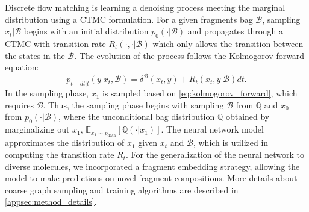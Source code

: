 Discrete flow matching is learning a denoising process meeting the marginal distribution using a CTMC formulation.
For a given fragments bag $\mathcal{B}$, sampling $x_t\vert \mathcal{B}$ begins with an initial distribution $p_0(\cdot|\mathcal{B})$ and propagates through a CTMC with transition rate $R_{t}(\cdot, \cdot \vert \mathcal{B})$ which only allows the transition between the states in the $\mathcal{B}$.
The evolution of the process follows the Kolmogorov forward equation: 
\begin{equation} \label{eq:kolmogorov_forward}
p_{t+dt|t}(y|x_t, \mathcal{B}) = \delta ^ \mathcal{B} (x_t,y) + R_{t}(x_{t},y|\mathcal{B})dt.
\end{equation}
In the sampling phase, $x_1$ is sampled based on \cref{eq:kolmogorov_forward}, which requires $\mathcal{B}$.
Thus, the sampling phase begins with sampling $\mathcal{B}$ from $\mathbb{Q}$ and $x_0$ from $p_0(\cdot \vert \mathcal{B})$, where the unconditional bag distribution $\mathbb{Q}$ obtained by marginalizing out $x_1$, $\mathbb{E}_{x_1\sim p_{\text{data}}}\left[\mathbb{Q}(\cdot\vert x_1)\right]$.
The neural network model approximates the distribution of $x_1$ given $x_t$ and $\mathcal{B}$, which is utilized in computing the transition rate $R_t$.
For the generalization of the neural network to diverse molecules, we incorporated a fragment embedding strategy, allowing the model to make predictions on novel fragment compositions.
More details about coarse graph sampling and training algorithms are described in \cref{appsec:method_details}.


%



